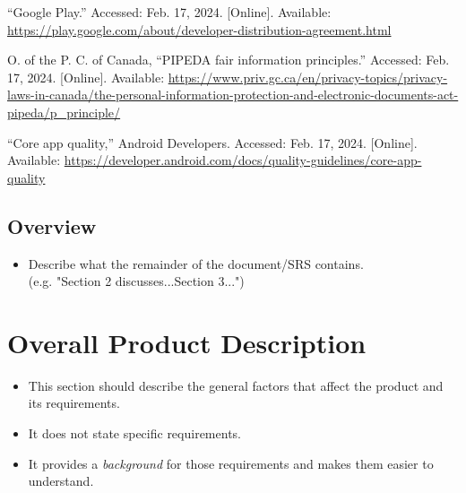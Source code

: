 \documentclass[]{article}
\begin{document}
\begin{itemize}
\begin{thebibliography}{99}
		 “Google Play.” Accessed: Feb. 17, 2024. [Online]. Available: \url{https://play.google.com/about/developer-distribution-agreement.html}
		
		 O. of the P. C. of Canada, “PIPEDA fair information principles.” Accessed: Feb. 17, 2024. [Online]. Available: \url{https://www.priv.gc.ca/en/privacy-topics/privacy-laws-in-canada/the-personal-information-protection-and-electronic-documents-act-pipeda/p_principle/}
		
		 “Core app quality,” Android Developers. Accessed: Feb. 17, 2024. [Online]. Available: \url{https://developer.android.com/docs/quality-guidelines/core-app-quality}
	\end{thebibliography}
\end{itemize}

\subsection{Overview}
\label{sub:overview}
\begin{itemize}
	\item Describe what the remainder of the document/SRS contains.\\
	(e.g. "Section 2 discusses...Section 3...")
\end{itemize}


\section{Overall Product Description}
\label{sec:overall_description}

\begin{itemize}
	\item This section should describe the general factors that affect the product and its requirements. 
	\item It does not state specific requirements.
	\item It provides a \emph{background} for those requirements and makes them easier to understand.
\end{itemize}
\end{document}
